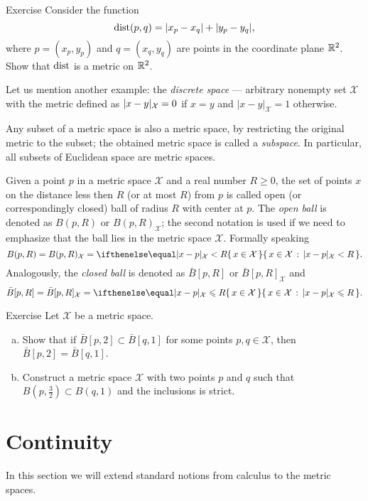 \begin{thm}{Exercise}
Consider the function
$$\mathop{\rm dist}\nolimits(p,q)=|x_p-x_q|+|y_p-y_q|,$$
where $p=(x_p,y_p)$ and $q=(x_q,y_q)$ are points in the coordinate plane $\mathbb{R}^2$.
Show that $\mathop{\rm dist}\nolimits$ is a metric on $\mathbb{R}^2$.
\end{thm}

Let us mention another example: the \emph{discrete space} --- arbitrary nonempty set $\mathcal X$ with the metric defined as $|x\z-y|_{\mathcal X}=0$ if $x=y$ and $|x-y|_{\mathcal X}=1$ otherwise.

Any subset of a metric space is also a metric space, by restricting the original metric to the subset;
the obtained metric space is called a \emph{subspace}.
In particular, all subsets of Euclidean space are metric spaces.

Given a point $p$ in a metric space ${\mathcal X}$ and a real number $R\ge 0$, the set of points $x$ on the distance less then $R$ (or at most $R$) from $p$ is called open (or correspondingly closed) ball of radius $R$ with center at $p$.
The \emph{open ball} is denoted as $B(p,R)$ or $B(p,R)_{\mathcal X}$;
the second notation is used if we need to emphasize that the ball lies in the metric space $\mathcal X$.
Formally speaking
\[B(p,R)=B(p,R)_{\mathcal X}=\set{x\in \mathcal X}{|x-p|_{\mathcal X}< R}.\]
Analogously, the \emph{closed ball} is denoted as $\bar B[p,R]$ or $\bar B[p,R]_{\mathcal X}$ and
\[\bar B[p,R]=\bar B[p,R]_{\mathcal X}=\set{x\in \mathcal X}{|x-p|_{\mathcal X}\le R}.\]

\begin{thm}{Exercise}\label{ex:B2inB1}
Let $\mathcal X$ be a metric space.
\begin{enumerate}[(a)]
\item Show that if $\bar B[p,2]\subset \bar B[q,1]$
for some points $p,q\in \mathcal X$, then $\bar B[p,2]= \bar B[q,1]$.
\item Construct a metric space $\mathcal X$ with two points $p$ and $q$ such that
$B(p,\tfrac32)\subset B(q,1)$ and the inclusions is strict.
\end{enumerate}

\end{thm}



\section{Continuity}

In this section we will extend standard notions from calculus to the metric spaces.

